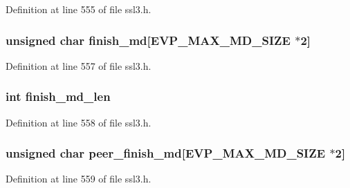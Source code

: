 Definition at line 555 of file ssl3.\+h.

\subsubsection[{\texorpdfstring{finish\+\_\+md}{finish_md}}]{\setlength{\rightskip}{0pt plus 5cm}unsigned char finish\+\_\+md\mbox{[}{\bf E\+V\+P\+\_\+\+M\+A\+X\+\_\+\+M\+D\+\_\+\+S\+I\+ZE} $\ast$2\mbox{]}}\hypertarget{structssl3__state__st_a1ac65d7e5bd0dd6416a165d27d5c25d0}{}\label{structssl3__state__st_a1ac65d7e5bd0dd6416a165d27d5c25d0}


Definition at line 557 of file ssl3.\+h.

\subsubsection[{\texorpdfstring{finish\+\_\+md\+\_\+len}{finish_md_len}}]{\setlength{\rightskip}{0pt plus 5cm}int finish\+\_\+md\+\_\+len}\hypertarget{structssl3__state__st_a2708c343a760a0b06a65536d4b57c659}{}\label{structssl3__state__st_a2708c343a760a0b06a65536d4b57c659}


Definition at line 558 of file ssl3.\+h.

\subsubsection[{\texorpdfstring{peer\+\_\+finish\+\_\+md}{peer_finish_md}}]{\setlength{\rightskip}{0pt plus 5cm}unsigned char peer\+\_\+finish\+\_\+md\mbox{[}{\bf E\+V\+P\+\_\+\+M\+A\+X\+\_\+\+M\+D\+\_\+\+S\+I\+ZE} $\ast$2\mbox{]}}\hypertarget{structssl3__state__st_a845435cf91f3ac30a4f11b29d25c5930}{}\label{structssl3__state__st_a845435cf91f3ac30a4f11b29d25c5930}


Definition at line 559 of file ssl3.\+h.

